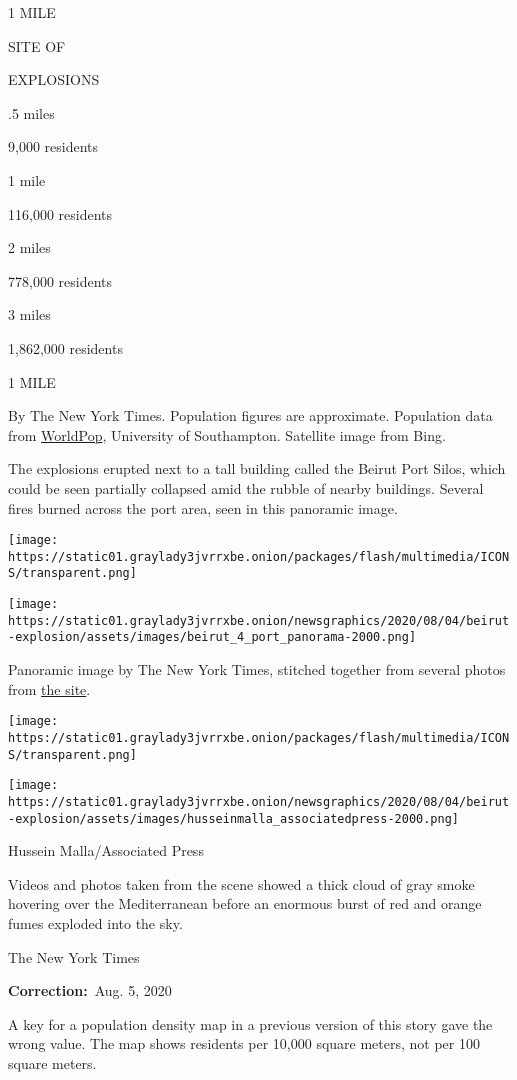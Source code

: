 1 MILE

SITE OF

EXPLOSIONS

.5 miles

9,000 residents

1 mile

116,000 residents

2 miles

778,000 residents

3 miles

1,862,000 residents

1 MILE

By The New York Times. Population figures are approximate. Population
data from \href{https://www.worldpop.org/}{WorldPop}, University of
Southampton. Satellite image from Bing.

The explosions erupted next to a tall building called the Beirut Port
Silos, which could be seen partially collapsed amid the rubble of nearby
buildings. Several fires burned across the port area, seen in this
panoramic image.

\texttt{[image: https://static01.graylady3jvrrxbe.onion/packages/flash/multimedia/ICONS/transparent.png]}

\texttt{[image: https://static01.graylady3jvrrxbe.onion/newsgraphics/2020/08/04/beirut-explosion/assets/images/beirut\_4\_port\_panorama-2000.png]}

Panoramic image by The New York Times, stitched together from several
photos from
\href{https://twitter.com/PsychologyDoc/status/1290705761467801601}{the
site}.

\texttt{[image: https://static01.graylady3jvrrxbe.onion/packages/flash/multimedia/ICONS/transparent.png]}

\texttt{[image: https://static01.graylady3jvrrxbe.onion/newsgraphics/2020/08/04/beirut-explosion/assets/images/husseinmalla\_associatedpress-2000.png]}

Hussein Malla/Associated Press

Videos and photos taken from the scene showed a thick cloud of gray
smoke hovering over the Mediterranean before an enormous burst of red
and orange fumes exploded into the sky.

The New York Times

\textbf{Correction:}~Aug. 5, 2020

A key for a population density map in a previous version of this story
gave the wrong value. The map shows residents per 10,000 square meters,
not per 100 square meters.

